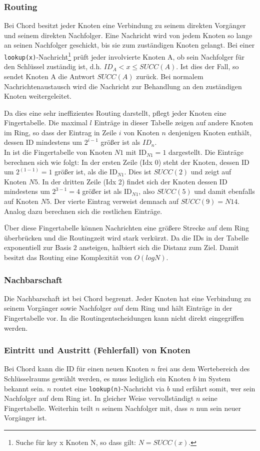 \subsubsection{Routing}
Bei Chord besitzt jeder Knoten eine Verbindung zu seinem direkten Vorgänger und seinem direkten Nachfolger. Eine Nachricht wird von jedem Knoten so lange an seinen Nachfolger geschickt, bis sie zum zuständigen Knoten gelangt. Bei einer \texttt{lookup(x)}-Nachricht\footnote{Suche für key x Knoten N, so dass gilt: $N = SUCC(x)$.} prüft jeder involvierte Knoten A, ob sein Nachfolger für den Schlüssel zuständig ist, d.h. $ID_A < x \le SUCC(A)$. Ist dies der Fall, so sendet Knoten A die Antwort $SUCC(A)$ zurück. Bei normalem Nachrichtenaustausch wird die Nachricht zur Behandlung an den zuständigen Knoten weitergeleitet.

Da dies eine sehr ineffizientes  Routing darstellt, pflegt jeder Knoten eine Fingertabelle. Die maximal $l$ Einträge in dieser Tabelle zeigen auf andere Knoten im Ring, so dass der Eintrag in Zeile $i$ von Knoten $n$ denjenigen Knoten enthält, dessen ID mindestens um $2^{i-1}$ größer ist als $ID_n$.\\
In  ist die Fingertabelle von Knoten $N1$ mit ID$_{N1} = 1$ dargestellt. Die Einträge berechnen sich wie folgt: In der ersten Zeile (Idx 0) steht der Knoten, dessen ID um $2^(1-1) = 1$ größer ist, als die ID$_{N1}$. Dies ist $SUCC(2)$ und zeigt auf Knoten $N5$. In der dritten Zeile (Idx 2) findet sich der Knoten dessen ID mindestens um $2^{3-1} = 4$ größer ist als ID$_{N1}$, also $SUCC(5)$ und damit ebenfalls auf Knoten $N5$. Der vierte Eintrag verweist demnach auf $SUCC(9) = N14$. Analog dazu berechnen sich die restlichen Einträge.

Über diese Fingertabelle können Nachrichten eine größere Strecke auf dem Ring überbrücken und die Routingzeit wird stark verkürzt. Da die IDs in der Tabelle exponentiell zur Basis $2$ ansteigen, halbiert sich die Distanz zum Ziel. Damit besitzt das Routing eine Komplexität von $O(log N)$.

\subsubsection{Nachbarschaft}
Die Nachbarschaft ist bei Chord begrenzt. Jeder Knoten hat eine Verbindung zu seinem Vorgänger sowie Nachfolger auf dem Ring und hält Einträge in der Fingertabelle vor. In die Routingentscheidungen kann nicht direkt eingegriffen werden.

\subsubsection{Eintritt und Austritt (Fehlerfall) von Knoten}
Bei Chord kann die ID für einen neuen Knoten $n$ frei aus dem Wertebereich des Schlüsselraums gewählt werden, es muss lediglich ein Knoten $b$ im System bekannt sein. $n$ routet eine \texttt{lookup(n)}-Nachricht via $b$ und erfährt somit, wer sein Nachfolger auf dem Ring ist. In gleicher Weise vervollständigt $n$ seine Fingertabelle. Weiterhin teilt $n$ seinem Nachfolger mit, dass $n$ nun sein neuer Vorgänger ist.

